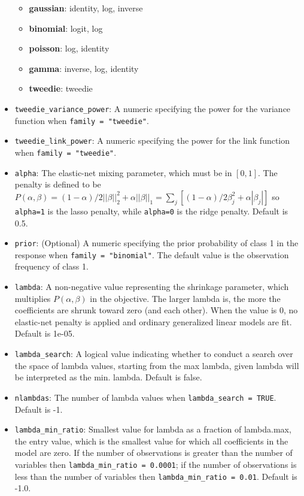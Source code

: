 \documentclass[11pt]{article}
\begin{document}
\begin{itemize}
	\begin{itemize}
\item	{\textbf {gaussian}}: identity, log, inverse 
\item {\textbf{binomial}}: logit, log 
\item {\textbf{poisson}}: log, identity
\item {\textbf{gamma}}: inverse, log, identity
\item {\textbf{tweedie}}: tweedie 
	\end{itemize}
\item \texttt{tweedie\_variance\_power}: A numeric specifying the power for the variance function when \texttt{family = "tweedie"}. 
\item \texttt{tweedie\_link\_power}: A numeric specifying the power for the link function when \texttt{family = "tweedie"}. 
\item \texttt{alpha}: The elastic-net mixing parameter, which must be in $[0,1]$. The penalty is defined to be $P(\alpha,\beta) = (1-\alpha)/2||\beta||_2^2 + \alpha||\beta||_1 = \sum_j [(1-\alpha)/2 \beta_j^2 + \alpha|\beta_j|] $ so \texttt{alpha=1} is the lasso penalty, while \texttt{alpha=0} is the ridge penalty. Default is 0.5.
\item \texttt{prior}: (Optional) A numeric specifying the prior probability of class 1 in the response when \texttt{family = "binomial"}. The default value is the observation frequency of class 1. 
\item \texttt{lambda}: A non-negative value representing the shrinkage parameter, which multiplies $P(\alpha,\beta)$ in the objective. The larger lambda is, the more the coefficients are shrunk toward zero (and each other). When the value is 0, no elastic-net penalty is applied and ordinary generalized linear models are fit. Default is 1e-05.
\item \texttt{lambda\_search}: A logical value indicating whether to conduct a search over the space of lambda values, starting from the max lambda, given lambda will be interpreted as the min. lambda. Default is false.
\item \texttt{nlambdas}: The number of lambda values when \texttt{lambda\_search = TRUE}. Default is -1.
\item \texttt{lambda\_min\_ratio}: Smallest value for lambda as a fraction of lambda.max, the entry value, which is the smallest value for which all coefficients in the model are zero. If the number of observations is greater than the number of variables then \texttt{lambda\_min\_ratio = 0.0001}; if the number of observations is less than the number of variables then \texttt{lambda\_min\_ratio = 0.01}. Default is -1.0.

\end{itemize}
\end{document}
